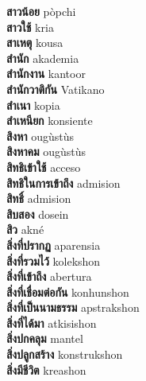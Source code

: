 \textbf{ สาวน้อย  } pòpchi \\
\textbf{ สาวใช้  } kria \\
\textbf{ สาเหตุ  } kousa \\
\textbf{ สำนัก  } akademia \\
\textbf{ สำนักงาน  } kantoor \\
\textbf{ สำนักวาติกัน  } Vatikano \\
\textbf{ สำเนา  } kopia \\
\textbf{ สำเหนียก  } konsiente \\
\textbf{ สิงหา  } ougùstùs \\
\textbf{ สิงหาคม  } ougùstùs \\
\textbf{ สิทธิเข้าใช้  } acceso \\
\textbf{ สิทธิในการเข้าถึง  } admision \\
\textbf{ สิทธิ์  } admision \\
\textbf{ สิบสอง  } dosein \\
\textbf{ สิว  } akné \\
\textbf{ สิ่งที่ปรากฏ  } aparensia \\
\textbf{ สิ่งที่รวมไว้  } kolekshon \\
\textbf{ สิ่งที่เข้าถึง  } abertura \\
\textbf{ สิ่งที่เชื่อมต่อกัน  } konhunshon \\
\textbf{ สิ่งที่เป็นนามธรรม  } apstrakshon \\
\textbf{ สิ่งที่ได้มา  } atkisishon \\
\textbf{ สิ่งปกคลุม  } mantel \\
\textbf{ สิ่งปลูกสร้าง  } konstrukshon \\
\textbf{ สิ่งมีชีวิต  } kreashon \\
